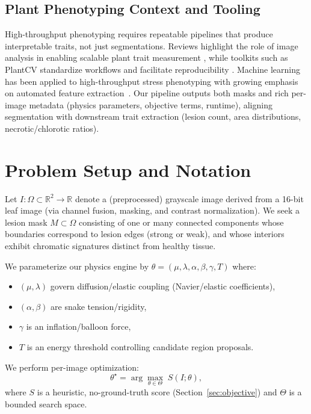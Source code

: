 \documentclass[journal]{IEEEtran}
\newcommand{\R}{\mathbb{R}}
\begin{document}
\subsection{Plant Phenotyping Context and Tooling}
High-throughput phenotyping requires repeatable pipelines that produce interpretable traits, not just segmentations. Reviews highlight the role of image analysis in enabling scalable plant trait measurement \cite{gehan2017high,mahlein2016plant}, while toolkits such as PlantCV standardize workflows and facilitate reproducibility \cite{plantcv2025}. Machine learning has been applied to high-throughput stress phenotyping with growing emphasis on automated feature extraction~\cite{singh2016machine}. Our pipeline outputs both masks and rich per-image metadata (physics parameters, objective terms, runtime), aligning segmentation with downstream trait extraction (lesion count, area distributions, necrotic/chlorotic ratios).

\section{Problem Setup and Notation}
Let $I:\Omega\subset\R^2\rightarrow\R$ denote a (preprocessed) grayscale image derived from a 16-bit leaf image (via channel fusion, masking, and contrast normalization). We seek a lesion mask $M\subset\Omega$ consisting of one or many connected components whose boundaries correspond to lesion edges (strong or weak), and whose interiors exhibit chromatic signatures distinct from healthy tissue.

We parameterize our physics engine by $\theta = (\mu,\lambda,\alpha,\beta,\gamma,T)$ where:
\begin{itemize}
    \item $(\mu,\lambda)$ govern diffusion/elastic coupling (Navier/elastic coefficients),
    \item $(\alpha,\beta)$ are snake tension/rigidity,
    \item $\gamma$ is an inflation/balloon force,
    \item $T$ is an energy threshold controlling candidate region proposals.
\end{itemize}
We perform per-image optimization:
\begin{equation}
\theta^\star = \arg\max_{\theta \in \Theta} \; S(I;\theta),
\end{equation}
where $S$ is a heuristic, no-ground-truth score (Section~\ref{sec:objective}) and $\Theta$ is a bounded search space.
\end{document}
